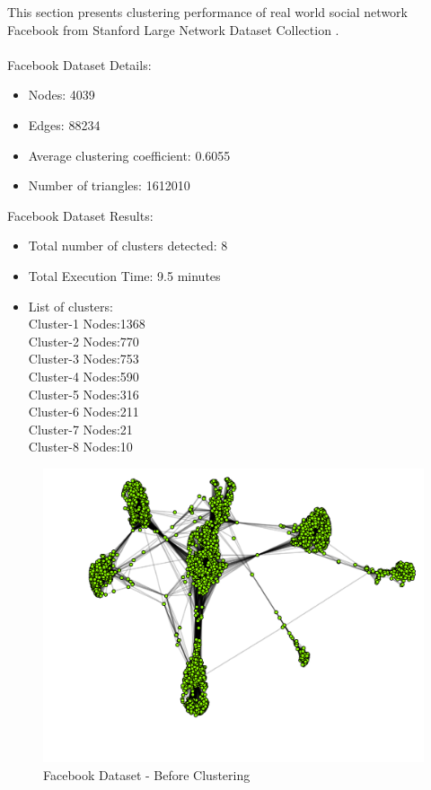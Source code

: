 This section presents clustering performance of real world social network Facebook \cite{facebookdata} from Stanford Large Network Dataset Collection \cite{snap}.\\
\\
Facebook Dataset Details:
\begin{itemize}
	\item
	Nodes: 4039
	\item
	Edges: 88234
	\item
	Average clustering coefficient:	0.6055
	\item
	Number of triangles:	1612010
\end{itemize}
\noindent
Facebook Dataset Results:
\begin{itemize}
	\item
	Total number of clusters detected: 8
	\item
	Total Execution Time: 9.5 minutes
	\item
	List of clusters:\\
	Cluster-1 Nodes:1368\\
	Cluster-2 Nodes:770\\
	Cluster-3 Nodes:753\\
	Cluster-4 Nodes:590\\
	Cluster-5 Nodes:316\\
	Cluster-6 Nodes:211\\
	Cluster-7 Nodes:21\\
	Cluster-8 Nodes:10\\	
\end{itemize}
\begin{figure}[H]
	\centering
	\includegraphics[scale=0.4, trim=0 0 20 0]{Images/before_facebook.pdf}
	\caption{Facebook Dataset - Before Clustering\label{fig:fb-before}}
\end{figure}
